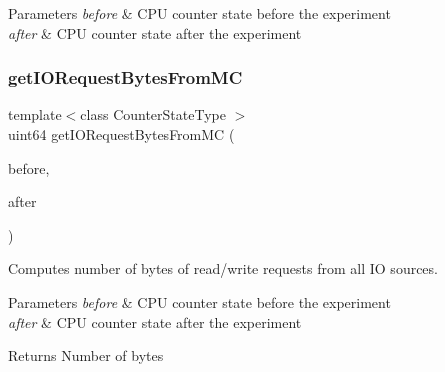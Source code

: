 \begin{DoxyParams}{Parameters}
{\em before} & C\+PU counter state before the experiment \\
\hline
{\em after} & C\+PU counter state after the experiment \\
\hline
\end{DoxyParams}
\mbox{\label{class_uncore_counter_state_a7e5434dba3a810501f289329e52b889d}} 
\subsubsection{\texorpdfstring{get\+I\+O\+Request\+Bytes\+From\+MC}{getIORequestBytesFromMC}}
{\footnotesize\ttfamily template$<$class Counter\+State\+Type $>$ \\
uint64 get\+I\+O\+Request\+Bytes\+From\+MC (\begin{DoxyParamCaption}\item[{const Counter\+State\+Type \&}]{before,  }\item[{const Counter\+State\+Type \&}]{after }\end{DoxyParamCaption})\hspace{0.3cm}{\ttfamily [friend]}}



Computes number of bytes of read/write requests from all IO sources. 


\begin{DoxyParams}{Parameters}
{\em before} & C\+PU counter state before the experiment \\
\hline
{\em after} & C\+PU counter state after the experiment \\
\hline
\end{DoxyParams}
\begin{DoxyReturn}{Returns}
Number of bytes 
\end{DoxyReturn}
\mbox{\label{class_uncore_counter_state_a5e34f7b0326dda86b54fcb7bb84a0b38}} 

